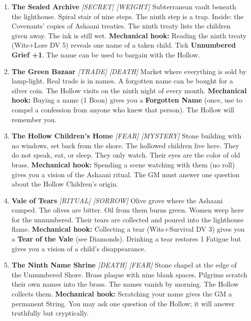 \begin{enumerate}
\item \textbf{The Sealed Archive} \hfill \textit{[SECRET] [WEIGHT]}  
  Subterranean vault beneath the lighthouse. Spiral stair of nine steps. The ninth step is a trap. Inside: the Covenants' copies of Ashaani treaties. The ninth treaty lists the children given away. The ink is still wet.  
  \textbf{Mechanical hook:} Reading the ninth treaty (Wits+Lore DV 5) reveals one name of a taken child. Tick \textbf{Unnumbered Grief +1}. The name can be used to bargain with the Hollow.

\item \textbf{The Green Bazaar} \hfill \textit{[TRADE] [DEATH]}  
  Market where everything is sold by lamp-light. Real trade is in names. A forgotten name can be bought for a silver coin. The Hollow visits on the ninth night of every month.  
  \textbf{Mechanical hook:} Buying a name (1 Boon) gives you a \textbf{Forgotten Name} (once, use to compel a confession from anyone who knew that person). The Hollow will remember you.

\item \textbf{The Hollow Children's Home} \hfill \textit{[FEAR] [MYSTERY]}  
  Stone building with no windows, set back from the shore. The hollowed children live here. They do not speak, eat, or sleep. They only watch. Their eyes are the color of old brass.  
  \textbf{Mechanical hook:} Spending a scene watching with them (no roll) gives you a vision of the Ashaani ritual. The GM must answer one question about the Hollow Children's origin.

\item \textbf{Vale of Tears} \hfill \textit{[RITUAL] [SORROW]}  
  Olive grove where the Ashaani camped. The olives are bitter. Oil from them burns green. Women weep here for the unnumbered. Their tears are collected and poured into the lighthouse flame.  
  \textbf{Mechanical hook:} Collecting a tear (Wits+Survival DV 3) gives you a \textbf{Tear of the Vale} (see Diamonds). Drinking a tear restores 1 Fatigue but gives you a vision of a child's disappearance.

\item \textbf{The Ninth Name Shrine} \hfill \textit{[DEATH] [FEAR]}  
  Stone chapel at the edge of the Unnumbered Shore. Brass plaque with nine blank spaces. Pilgrims scratch their own names into the brass. The names vanish by morning. The Hollow collects them.  
  \textbf{Mechanical hook:} Scratching your name gives the GM a permanent String. You may ask one question of the Hollow; it will answer truthfully but cryptically.


\end{enumerate}
